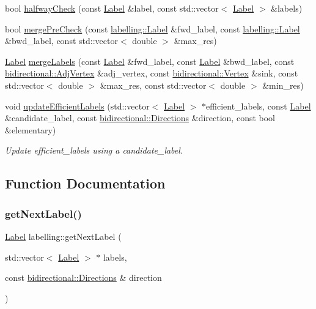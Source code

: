 \begin{DoxyCompactItemize}
\item 
bool \hyperlink{namespacelabelling_ad7fee591bcb066e39ff97138ab0ba5ca}{halfway\+Check} (const \hyperlink{classlabelling_1_1Label}{Label} \&label, const std\+::vector$<$ \hyperlink{classlabelling_1_1Label}{Label} $>$ \&labels)
\item 
bool \hyperlink{namespacelabelling_a9c2e8f16965144d445ba68216dae648f}{merge\+Pre\+Check} (const \hyperlink{classlabelling_1_1Label}{labelling\+::\+Label} \&fwd\+\_\+label, const \hyperlink{classlabelling_1_1Label}{labelling\+::\+Label} \&bwd\+\_\+label, const std\+::vector$<$ double $>$ \&max\+\_\+res)
\item 
\hyperlink{classlabelling_1_1Label}{Label} \hyperlink{namespacelabelling_a19937349c6ec5c31d5994aac45c5d2fd}{merge\+Labels} (const \hyperlink{classlabelling_1_1Label}{Label} \&fwd\+\_\+label, const \hyperlink{classlabelling_1_1Label}{Label} \&bwd\+\_\+label, const \hyperlink{structbidirectional_1_1AdjVertex}{bidirectional\+::\+Adj\+Vertex} \&adj\+\_\+vertex, const \hyperlink{structbidirectional_1_1Vertex}{bidirectional\+::\+Vertex} \&sink, const std\+::vector$<$ double $>$ \&max\+\_\+res, const std\+::vector$<$ double $>$ \&min\+\_\+res)
\item 
void \hyperlink{namespacelabelling_a7b560c6202ef232e2bbd0dce1d3923a7}{update\+Efficient\+Labels} (std\+::vector$<$ \hyperlink{classlabelling_1_1Label}{Label} $>$ $\ast$efficient\+\_\+labels, const \hyperlink{classlabelling_1_1Label}{Label} \&candidate\+\_\+label, const \hyperlink{namespacebidirectional_a4cbe6f0bfbd3629c2cd44c98014aed70}{bidirectional\+::\+Directions} \&direction, const bool \&elementary)
\begin{DoxyCompactList}\small\item\em Update efficient\+\_\+labels using a candidate\+\_\+label. \end{DoxyCompactList}\end{DoxyCompactItemize}


\subsection{Function Documentation}
\mbox{\label{namespacelabelling_a7d32365acb745f452e0b81beed2ce2be}} 
\subsubsection{\texorpdfstring{get\+Next\+Label()}{getNextLabel()}}
{\footnotesize\ttfamily \hyperlink{classlabelling_1_1Label}{Label} labelling\+::get\+Next\+Label (\begin{DoxyParamCaption}\item[{std\+::vector$<$ \hyperlink{classlabelling_1_1Label}{Label} $>$ $\ast$}]{labels,  }\item[{const \hyperlink{namespacebidirectional_a4cbe6f0bfbd3629c2cd44c98014aed70}{bidirectional\+::\+Directions} \&}]{direction }\end{DoxyParamCaption})}

